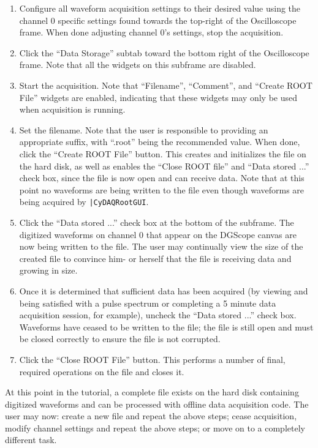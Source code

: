 \begin{enumerate}
  \item{Configure all waveform acquisition settings to their desired
    value using the channel 0 specific settings found towards the
    top-right of the Oscilloscope frame. When done adjusting channel
    0's settings, stop the acquisition.}
  \item{Click the ``Data Storage'' subtab toward the bottom right of
    the Oscilloscope frame. Note that all the widgets on this
    subframe are disabled.}
  \item{Start the acquisition. Note that ``Filename'', ``Comment'',
    and ``Create ROOT File'' widgets are enabled, indicating that
    these widgets may only be used when acquisition is running.}
  \item{Set the \ROOT filename. Note that the user is responsible to
    providing an appropriate suffix, with ``.root'' being the
    recommended value. When done, click the ``Create ROOT File''
    button. This creates and initializes the \ROOT file on the hard
    disk, as well as enables the ``Close ROOT file'' and ``Data stored
    ...'' check box, since the \ROOT file is now open and can receive
    data. Note that at this point no waveforms are being written to
    the \ROOT file even though waveforms are being acquired by
    \texttt{|CyDAQRootGUI}.}
  \item{Click the ``Data stored ...'' check box at the bottom of the
    subframe. The digitized waveforms on channel 0 that appear on the
    DGScope canvas are now being written to the \ROOT file. The user
    may continually view the size of the created \ROOT file to
    convince him- or herself that the \ROOT file is receiving data and
    growing in size.}
  \item{Once it is determined that sufficient data has been acquired
    (by viewing and being satisfied with a pulse spectrum or
    completing a 5 minute data acquisition session, for example),
    uncheck the ``Data stored ...'' check box. Waveforms have ceased
    to be written to the \ROOT file; the \ROOT file is still open and
    must be closed correctly to ensure the file is not corrupted.}
  \item{Click the ``Close ROOT File'' button. This performs a number
    of final, required operations on the \ROOT file and closes it.}
\end{enumerate}

At this point in the tutorial, a complete \ROOT file exists on the
hard disk containing digitized waveforms and can be processed with
offline data acquisition code. The user may now: create a new \ROOT
file and repeat the above steps; cease acquisition, modify channel
settings and repeat the above steps; or move on to a completely
different task.

